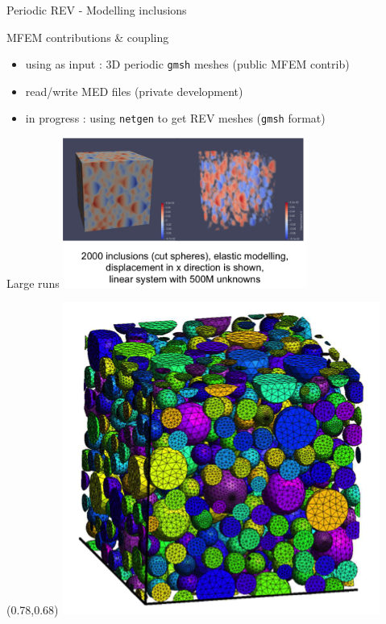 \documentclass{beamer}
\begin{document}
\begin{frame}{Periodic
    REV - Modelling inclusions}
  \begin{block}{MFEM contributions \& coupling}
    \begin{itemize}
      \item using as input : 3D periodic \texttt{gmsh} meshes (public MFEM contrib)
      \item read/write MED files (private development)
      \item in progress : using \texttt{netgen} to get REV meshes (\texttt{gmsh} format)
    \end{itemize}
  \end{block}
  \begin{block}{Large runs}
    \hspace*{2cm}\includegraphics[width=0.6\textwidth]{img/REV_2000inc.png}
  \end{block}
\begin{textblock}{.2}(0.78,0.68)
\includegraphics[width=\textwidth]{img/polydisperse.png}
\end{textblock}
\end{frame}
\end{document}
